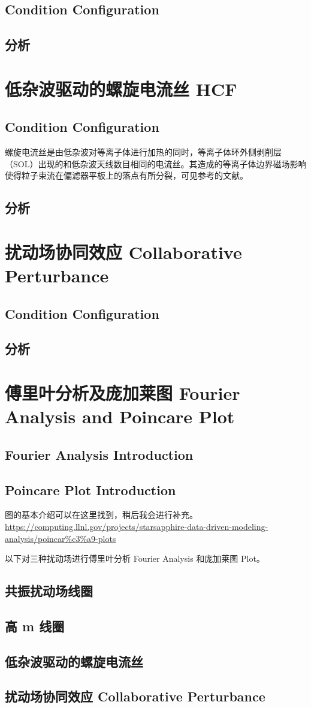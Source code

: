 \subsection{Condition Configuration}
\subsection{分析}
\section{低杂波驱动的螺旋电流丝 HCF}
\subsection{Condition Configuration}
螺旋电流丝是由低杂波对等离子体进行加热的同时，等离子体环外侧剥削层（SOL）出现的和低杂波天线数目相同的电流丝。其造成的等离子体边界磁场影响使得粒子束流在偏滤器平板上的落点有所分裂，可见参考的文献。
\subsection{分析}
\section{扰动场协同效应 Collaborative Perturbance}
\subsection{Condition Configuration}
\subsection{分析}

\section{傅里叶分析及庞加莱图 Fourier Analysis and Poincare Plot}

\subsection{Fourier Analysis Introduction}

\subsection{Poincare Plot Introduction}
\Poincare 图的基本介绍可以在这里找到，稍后我会进行补充。
\url{https://computing.llnl.gov/projects/starsapphire-data-driven-modeling-analysis/poincar%c3%a9-plots}



以下对三种扰动场进行傅里叶分析 Fourier Analysis 和庞加莱图 \Poincare Plot。
\subsection{共振扰动场线圈}
\subsection{高 m 线圈}
\subsection{低杂波驱动的螺旋电流丝}
\subsection{扰动场协同效应 Collaborative Perturbance}
